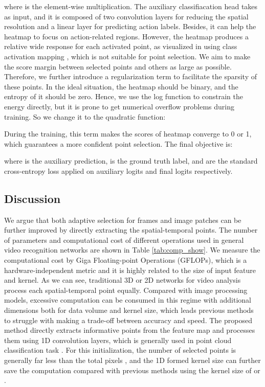 \documentclass[journal]{IEEEtran}
\begin{document}
where  is the element-wise multiplication.
The auxiliary classifiacation head takes  as input, and it is composed of two convolution layers for reducing the spatial resolution and a linear layer for predicting action labels.
Besides, it can help the heatmap to focus on action-related regions.
However, the heatmap produces a relative wide response for each activated point, as visualized in \cite{wang2021tdn, sudhakaran2020gate} using class activation mapping \cite{zhou2016learning}, which is not suitable for point selection.
We aim to make the score margin between selected points and others as large as possible.
Therefore, we further introduce a regularization term to facilitate the sparsity of these points.
In the ideal situation, the heatmap should be binary, and the entropy of it should be zero.
Hence, we use the log function to constrain the energy directly, but it is prone to get numerical overflow problems during training.
So we change it to the quadratic function:

During the training, this term makes the scores of heatmap converge to 0 or 1, which guarantees a more confident point selection.
The final objective is:

where  is the auxiliary prediction,  is the ground truth label,  and  are the standard cross-entropy loss applied on auxiliary logits and final logits respectively.

\subsection{Discussion}
We argue that both adaptive selection for frames and image patches can be further improved by directly extracting the spatial-temporal points.
The number of parameters and computational cost of different operations used in general video recognition networks are shown in Table \ref{tab:comp_show}.
We measure the computational cost by Giga Floating-point Operations (GFLOPs), which is a hardware-independent metric and it is highly related to the size of input feature and kernel.
As we can see, traditional 3D or 2D networks for video analysis process each spatial-temporal point equally.
Compared with image processing models, excessive computation can be consumed in this regime with additional dimensions both for data volume and kernel size, which leads previous methods to struggle with making a trade-off between accuracy and speed.
The proposed method directly extracts informative points from the feature map and processes them using 1D convolution layers, which is generally used in point cloud classification task \cite{qi2017pointnet, qi2017pointnet++}.
For this initialization, the number of selected points  is generally far less than the total pixels , and the 1D formed kernel size  can further save the computation compared with previous methods using the kernel size of  or .
\end{document}
